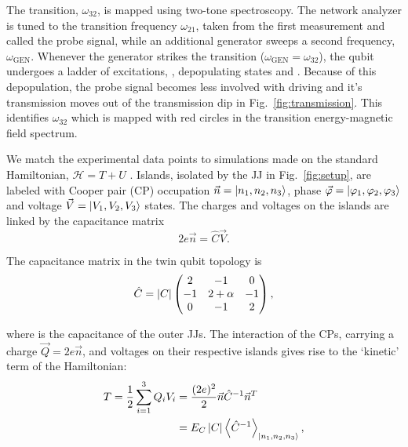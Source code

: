 The \ilra{}  transition, $\omega_{32}$, is  mapped using two-tone  spectroscopy.  The
network  analyzer is  tuned to  the transition  frequency  $ \omega_{21}  $, taken  from the  first
measurement  and called  the  probe signal,  while  an additional  generator  sweeps a  second
frequency,  $  \omega_{\text{GEN}} $.   Whenever  the  generator strikes  the  \ira{}
transition ($\omega_{\text{GEN}} = \omega_{32} $), the qubit undergoes a ladder of excitations, 
    ,  depopulating  states    and
.  Because of  this depopulation, the probe signal becomes  less involved with driving
and it's transmission moves out of  the transmission dip in Fig.~\ref{fig:transmission}.  This
identifies $\omega_{32}$ which  is mapped with red circles in  the transition energy-magnetic field
spectrum.


We  match the  experimental  data points  to  simulations made  on  the standard  Hamiltonian,
$  \mathcal{H}   =  T   +  U   $  \cite{orlando1999}.    Islands,  isolated   by  the   JJ  in
Fig.~\ref{fig:setup},     are     labeled     with     Cooper     pair     (CP)     occupation
$         \vec{n}        =         \Ket{n_1,        n_2,         n_3}        $,         phase
$       \vec{\varphi}       =       \Ket{\varphi_1,       \varphi_2,       \varphi_3}       $       and       voltage
$ \vec{V} = \Ket{V_{1}, V_{2}, V_{3}} $ states.   The charges and voltages on the islands are
linked by the capacitance matrix
\begin{equation}
  \label{eq:link}
  2e\vec{n} = \hat{C}\vec{V}.
\end{equation}

\noindent The capacitance matrix in the twin qubit topology is
\begin{equation}
  \label{eq:capac}
  \hat{C} = \left|C\right| \begin{pmatrix}
    2  &  -1  &  0\\
    -1  &  2  +  \alpha  &  -1\\
    0  &  -1  & 2
  \end{pmatrix},
\end{equation}

\noindent where   is the capacitance  of the outer  JJs.  The interaction of  the CPs,
carrying a charge $  \vec{Q}=2e\vec{n} $, and voltages on their  respective islands gives rise
to the `kinetic' term of the Hamiltonian:
\begin{equation}\label{eq:kinetic}
  \begin{aligned}
    T = \frac{1}{2}\sum_{i=1}^{3}Q_iV_i & =
    \frac{(2e)^2}{2}\vec{n}\hat{C}^{-1}\vec{n}^{T}\\
    & = E_C \left|C\right| \left\langle \hat{C}^{-1} \right\rangle_{\Ket{n_{1}, n_2, n_3}},
  \end{aligned}
\end{equation}

